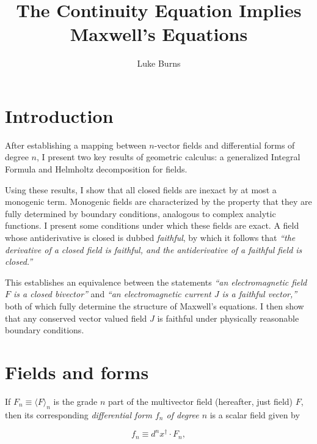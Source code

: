 \documentclass{article}
\title{The Continuity Equation Implies Maxwell's Equations}
\author{Luke Burns}
\begin{document}
\maketitle
{}

\section{Introduction}

After establishing a mapping between $n$-vector fields and differential forms of degree $n$, I present two key results of geometric calculus: a generalized Integral Formula and Helmholtz decomposition for fields. 

Using these results, I show that all closed fields are inexact by at most a monogenic term. Monogenic fields are characterized by the property that they are fully determined by boundary conditions, analogous to complex analytic functions. I present some conditions under which these fields are exact. A field whose antiderivative is closed is dubbed \emph{faithful}, by which it follows that \emph{``the derivative of a closed field is faithful, and the antiderivative of a faithful field is closed.''}

This establishes an equivalence between the statements \emph{``an electromagnetic field $F$ is a closed bivector''} and \emph{``an electromagnetic current $J$ is a faithful vector,''} both of which fully determine the structure of Maxwell's equations. I then show that any conserved vector valued field $J$ is faithful under physically reasonable boundary conditions.

\section{Fields and forms} If $F_n \equiv \langle F \rangle_n$ is the grade $n$ part of the multivector field (hereafter, just field) $F$, then its corresponding \emph{differential form $f_n$ of degree $n$} is a scalar field given by \cite{cagc}

\begin{equation}
  f_n \equiv d^nx^\dagger \cdot F_n,\label{eq:form}
\end{equation}
\end{document}
